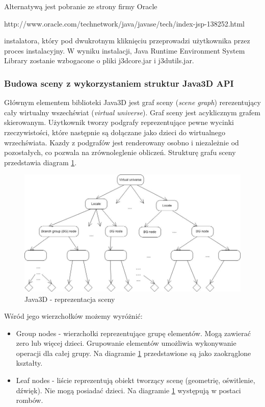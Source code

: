 Alternatywą jest pobranie ze strony firmy Oracle 
\begin{center}
http://www.oracle.com/technetwork/java/javase/tech/index-jsp-138252.html \\
\end{center}
instalatora, który pod dwukrotnym kliknięciu przeprowadzi użytkownika przez proces instalacyjny. 
W wyniku instalacji, Java Runtime Environment System Library zostanie wzbogacone o pliki j3dcore.jar i j3dutils.jar.
\subsubsection{Budowa sceny z wykorzystaniem struktur Java3D API}
Głównym elementem biblioteki Java3D jest graf sceny (\textit{scene graph}) rerezentujący cały wirtualny wszechświat (\textit{virtual universe}). Graf sceny jest acyklicznym grafem skierowanym.  Użytkownik tworzy podgrafy reprezentujące pewne wycinki rzeczywistości, które następnie są dołączane jako dzieci do wirtualnego wrzechświata. Kazdy z podgrafów jest renderowany  osobno i niezależnie od pozostałych, co pozwala na zrównoleglenie obliczeń. Strukturę grafu sceny przedstawia diagram \ref{java3d_diagram_sceny}.
\begin{figure}
\begin {center}
\includegraphics{java3d_diagram_sceny.jpg} 
\caption {Java3D - reprezentacja sceny}
\label {java3d_diagram_sceny}
\end {center}
\end{figure}
 Wśród jego wierzchołków możemy wyróżnić:
\begin{itemize}
\item Group nodes - wierzchołki reprezentujące grupę elementów. Mogą zawierać zero lub więcej dzieci. Grupowanie elementów umożliwia wykonywanie operacji dla całej grupy. Na diagramie \ref{java3d_diagram_sceny} przedstawione są jako zaokrąglone kształty.
\item Leaf nodes - liście reprezentują obiekt tworzący scenę (geometrię, oświtlenie, dźwięk). Nie mogą posiadać dzieci. Na diagramie \ref{java3d_diagram_sceny} występują w postaci rombów.
\end{itemize}
